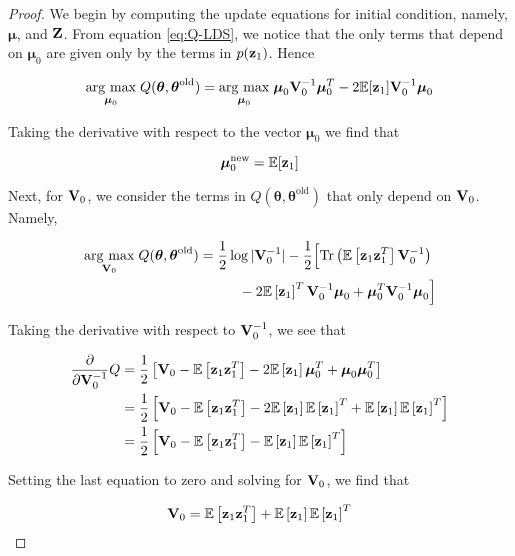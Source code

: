 \documentclass[11pt]{article}
\numberwithin{equation}{section}
\newcommand{\argmax}[1]{\underset{#1}{\operatorname{arg}\,\operatorname{max}}\;}
\newcommand{\expectation}[1]{\mathbb{E}\left[#1\right]}
\newcommand{\z}{{\bf z}}
\begin{document}
\begin{proof}
	We begin by computing the update equations for initial condition, namely, $\boldsymbol\mu$, and $\bf Z$. From equation \eqref{eq:Q-LDS}, we notice that the only terms that depend on $\boldsymbol{\mu}_0$ are given only by the terms in $p(\z_1)$. Hence

\begin{align}
	\argmax{\boldsymbol{\mu}_0} Q(\boldsymbol\theta, \boldsymbol\theta^\text{old}) = \argmax{\boldsymbol{\mu}_0} \boldsymbol{\mu}_0 {\bf V}_0^{-1}\boldsymbol{\mu}_0^T -2\mathbb{E}[{\z_1}]{\bf V}_0^{-1}\boldsymbol{\mu}_0 \nonumber
\end{align}

Taking the derivative with respect to the vector $\boldsymbol{\mu}_0$ we find that

\begin{equation}
	\boldsymbol{\mu}_0^\text{new} = \mathbb{E}[{\z_1}]
\end{equation}

Next, for ${\bf V}_0$, we consider the terms in $Q(\boldsymbol\theta, \boldsymbol\theta^\text{old})$ that only depend on ${\bf V}_0$. Namely,

\begin{align}
	\argmax{{\bf V}_0} Q(\boldsymbol\theta, \boldsymbol\theta^\text{old}) &= \frac{1}{2}\log \vert
	  {\bf V}_0^{-1}\vert -\frac{1}{2}\Big[\text{Tr}\left(\mathbb{E}\left[\z_1 \z_1^T\right] {\bf V}_0^{-1}\right) \nonumber\\
	  &\hspace{1cm} -2 \mathbb{E}\left[\z_1\right]^T{\bf V}_0^{-1}\boldsymbol\mu_0 + \boldsymbol\mu_0^T {\bf V}_0^{-1}\boldsymbol\mu_0\Big] \nonumber
\end{align}

Taking the derivative with respect to ${\bf V}_0^{-1}$, we see that

\begin{align}
	\frac{\partial}{\partial {\bf V}_0^{-1}} Q &= \frac{1}{2}\left[{\bf V}_0 - \expectation{\z_1 \z_1^T} - 2\expectation{\z_1}\boldsymbol{\mu}_0^T + \boldsymbol{\mu}_0 \boldsymbol{\mu}_0^T \right] \nonumber \\
	&= \frac{1}{2} \left[{\bf V}_0 - \expectation{\z_1 \z_1^T} - 2\expectation{\z_1}\expectation{\z_1}^T + \expectation{\z_1}\expectation{\z_1}^T \right] \nonumber \\
	&= \frac{1}{2}\left[{\bf V}_0 - \expectation{\z_1 \z_1^T} - \expectation{\z_1}\expectation{\z_1}^T\right]
\end{align}

Setting the last equation to zero and solving for ${\bf V}_0$, we find that

\begin{equation}
	{\bf V}_0 = \expectation{\z_1 \z_1^T} + \expectation{\z_1}\expectation{\z_1}^T
\end{equation}
\end{proof}
\end{document}
